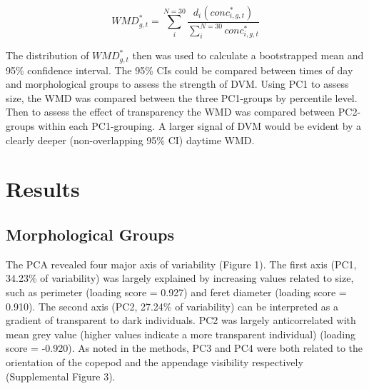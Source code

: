 \documentclass[
]{article}
\begin{document}
\[WMD^*_{g,t} = \sum_{i}^{N = 30}{\frac{d_i(conc^*_{i,g,t})}{\sum_i^{N = 30}{conc^*_{i,g,t}}}}\]

The distribution of \(WMD^*_{g,t}\) then was used to calculate a
bootstrapped mean and 95\% confidence interval. The 95\% CIs could be
compared between times of day and morphological groups to assess the
strength of DVM. Using PC1 to assess size, the WMD was compared between
the three PC1-groups by percentile level. Then to assess the effect of
transparency the WMD was compared between PC2-groups within each
PC1-grouping. A larger signal of DVM would be evident by a clearly
deeper (non-overlapping 95\% CI) daytime WMD.

\hypertarget{results}{%
\section{Results}\label{results}}

\hypertarget{morphological-groups}{%
\subsection{Morphological Groups}\label{morphological-groups}}

The PCA revealed four major axis of variability (Figure 1). The first
axis (PC1, 34.23\% of variability) was largely explained by increasing
values related to size, such as perimeter (loading score = 0.927) and
feret diameter (loading score = 0.910). The second axis (PC2, 27.24\% of
variability) can be interpreted as a gradient of transparent to dark
individuals. PC2 was largely anticorrelated with mean grey value (higher
values indicate a more transparent individual) (loading score = -0.920).
As noted in the methods, PC3 and PC4 were both related to the
orientation of the copepod and the appendage visibility respectively
(Supplemental Figure 3).
\end{document}
